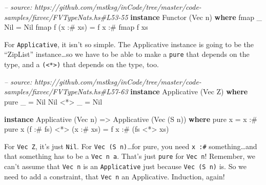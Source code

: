 \documentclass[]{article}
\newenvironment{Shaded}{}{}
\newcommand{\KeywordTok}[1]{\textcolor[rgb]{0.00,0.44,0.13}{\textbf{{#1}}}}
\newcommand{\DataTypeTok}[1]{\textcolor[rgb]{0.56,0.13,0.00}{{#1}}}
\newcommand{\CommentTok}[1]{\textcolor[rgb]{0.38,0.63,0.69}{\textit{{#1}}}}
\newcommand{\OtherTok}[1]{\textcolor[rgb]{0.00,0.44,0.13}{{#1}}}
\newcommand{\FunctionTok}[1]{\textcolor[rgb]{0.02,0.16,0.49}{{#1}}}
\newcommand{\NormalTok}[1]{{#1}}
\begin{document}
\begin{Shaded}
\begin{Highlighting}[]
\CommentTok{-- source: https://github.com/mstksg/inCode/tree/master/code-samples/fixvec/FVTypeNats.hs#L53-55}
\KeywordTok{instance} \DataTypeTok{Functor} \NormalTok{(}\DataTypeTok{Vec} \NormalTok{n) }\KeywordTok{where}
    \NormalTok{fmap _ }\DataTypeTok{Nil}       \FunctionTok{=} \DataTypeTok{Nil}
    \NormalTok{fmap f (x }\FunctionTok{:#} \NormalTok{xs) }\FunctionTok{=} \NormalTok{f x }\FunctionTok{:#} \NormalTok{fmap f xs}
\end{Highlighting}
\end{Shaded}

For \texttt{Applicative}, it isn't so simple. The Applicative instance is going
to be the ``ZipList'' instance\ldots{}so we have to be able to make a
\texttt{pure} that depends on the type, and a
\texttt{(\textless{}*\textgreater{})} that depends on the type, too.

\begin{Shaded}
\begin{Highlighting}[]
\CommentTok{-- source: https://github.com/mstksg/inCode/tree/master/code-samples/fixvec/FVTypeNats.hs#L57-63}
\KeywordTok{instance} \DataTypeTok{Applicative} \NormalTok{(}\DataTypeTok{Vec} \DataTypeTok{Z}\NormalTok{) }\KeywordTok{where}
    \NormalTok{pure _    }\FunctionTok{=} \DataTypeTok{Nil}
    \DataTypeTok{Nil} \FunctionTok{<*>} \NormalTok{_ }\FunctionTok{=} \DataTypeTok{Nil}

\KeywordTok{instance} \DataTypeTok{Applicative} \NormalTok{(}\DataTypeTok{Vec} \NormalTok{n) }\OtherTok{=>} \DataTypeTok{Applicative} \NormalTok{(}\DataTypeTok{Vec} \NormalTok{(}\DataTypeTok{S} \NormalTok{n)) }\KeywordTok{where}
    \NormalTok{pure x }\FunctionTok{=} \NormalTok{x }\FunctionTok{:#} \NormalTok{pure x}
    \NormalTok{(f }\FunctionTok{:#} \NormalTok{fs) }\FunctionTok{<*>} \NormalTok{(x }\FunctionTok{:#} \NormalTok{xs) }\FunctionTok{=} \NormalTok{f x }\FunctionTok{:#} \NormalTok{(fs }\FunctionTok{<*>} \NormalTok{xs)}
\end{Highlighting}
\end{Shaded}

For \texttt{Vec\ Z}, it's just \texttt{Nil}. For \texttt{Vec\ (S\ n)}\ldots{}for
pure, you need \texttt{x\ :\#} something\ldots{}and that something has to be a
\texttt{Vec\ n\ a}. That's just \texttt{pure} for \texttt{Vec\ n}! Remember, we
can't assume that \texttt{Vec\ n} is an \texttt{Applicative} just because
\texttt{Vec\ (S\ n)} is. So we need to add a constraint, that \texttt{Vec\ n} an
Applicative. Induction, again!
\end{document}
